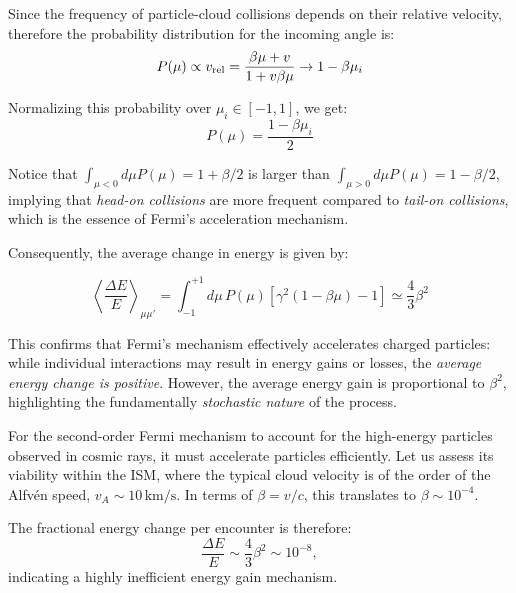 {\color{red}Since the frequency of particle-cloud collisions depends on their relative velocity, therefore the probability distribution for the incoming angle is:
\begin{equation}
P(\mu) \propto v_{\rm{rel}} =  \frac{\beta \mu + v}{1 + v \beta \mu} \rightarrow 1 - \beta \mu_i  
\end{equation}}

Normalizing this probability over \( \mu_i \in [-1,1] \), we get:
\begin{equation}
P(\mu) = \frac{1 - \beta \mu_i}{2}
\end{equation}

Notice that \( \int_{\mu < 0} d\mu P(\mu) = 1 + \beta / 2 \) is larger than \( \int_{\mu > 0} d\mu P(\mu) = 1 - \beta/2 \), implying that \emph{head-on collisions} are more frequent compared to \emph{tail-on collisions}, which is the essence of Fermi's acceleration mechanism.

Consequently, the average change in energy is given by:
%
\begin{remark}
\begin{equation}
\left\langle \frac{\Delta E}{E} \right\rangle_{\mu\mu'} 
= \int_{-1}^{+1} d\mu \, P(\mu) \left[ \gamma^2 \left( 1 - \beta \mu \right) - 1 \right] \simeq \frac{4}{3} \beta^2
\end{equation}
\end{remark}

This confirms that Fermi's mechanism effectively accelerates charged particles: while individual interactions may result in energy gains or losses, the \emph{average energy change is positive}. However, the average energy gain is proportional to \( \beta^2 \), highlighting the fundamentally \emph{stochastic nature} of the process. 

For the second-order Fermi mechanism to account for the high-energy particles observed in cosmic rays, it must accelerate particles efficiently. Let us assess its viability within the ISM, where the typical cloud velocity is of the order of the Alfvén speed, \( v_A \sim 10 \, \text{km/s} \). In terms of \( \beta = v / c \), this translates to \( \beta \sim 10^{-4} \). 

The fractional energy change per encounter is therefore:
\begin{equation}\label{eq:deltaeovere}
\frac{\Delta E}{E} \sim \frac{4}{3} \beta^2 \sim 10^{-8},
\end{equation}
indicating a highly inefficient energy gain mechanism. 


